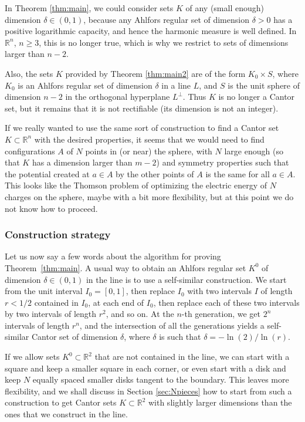 \documentclass[JEP,XML,SOM,Unicode,published]{cedram}
\numberwithin{equation}{section}
\theoremstyle{plain}
\theoremstyle{definition}
\newcommand{\R}{\mathbb{R}}
\newcommand{\R}{\mathbb{R}}
\begin{document}
In Theorem \ref{thm:main}, we could consider sets $K$ of any (small enough)
dimension $\delta \in (0,1)$, because any Ahlfors regular set of dimension $\delta > 0$ has a
positive logarithmic capacity, and hence the harmonic measure is well defined.
In $\R^n$, $n \geq 3$, this is no longer true,
which is why we restrict to sets of dimensions larger than $n-2$.

Also, the sets $K$ provided by Theorem \ref{thm:main2}
are of the form $K_0 \times S$, where $K_0$ is an Ahlfors regular set of dimension $\delta$ in a line $L$,
and $S$ is the unit sphere of dimension $n-2$ in the orthogonal hyperplane $L^\perp$. Thus $K$ is
no longer a Cantor set, but it remains that it is not rectifiable (its dimension is not an integer).

If we really wanted to use the same sort of construction to find a Cantor set
$K \subset \R^n$ with the desired properties, it seems that we would need to find
configurations $A$ of $N$ points in (or near) the sphere, with $N$ large enough
(so that $K$ has a dimension larger than $m-2$) and symmetry properties such that
the potential created at $a\in A$ by the other points of $A$ is the same for all $a \in A$.
This looks like the Thomson problem of optimizing the electric energy of $N$ charges on the sphere,
maybe with a bit more flexibility, but at this point we do not know how to proceed.

\subsubsection*{Construction strategy}

Let us now say a few words about the algorithm for proving Theorem~\ref{thm:main}.
A usual way to obtain an Ahlfors regular set $K^0$ of dimension
$\delta \in (0,1)$ in the line is to use a self-similar construction. We start from the
unit interval $I_0 = [0,1]$, then replace $I_0$ with two intervals $I$ of length $r < 1/2$
contained in $I_0$, at each end of $I_0$, then replace each of these two intervals by
two intervals of length $r^2$, and so on. At the $n$-th generation,
we get $2^n$ intervals of length $r^n$, and the intersection of all the generations yields a self-similar Cantor set of dimension $\delta$, where $\delta$ is such that $\delta = -\ln(2)/\ln(r)$.

If we allow sets $K^0 \subset \R^2$ that are not contained in the line,
we can start with a square and keep a smaller square in each corner, or even start with a disk and keep
$N$ equally spaced smaller disks tangent to the boundary. This leaves more flexibility, and we shall discuss in
Section \ref{sec:Npieces} how to start from such a construction to get Cantor sets $K \subset \R^2$ with slightly
larger dimensions than the ones that we construct in the line.
\end{document}
